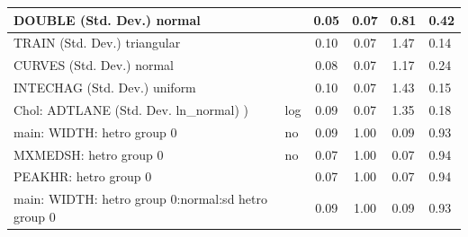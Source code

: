 \begin{table}
\begin{center}
\begin{tabular}{|l|l|c|c|c|l|}
			\hline
			DOUBLE (Std. Dev.) normal &  & 0.05 & 0.07 & 0.81 & 0.42 \\
			\hline
			TRAIN (Std. Dev.) triangular &  & 0.10 & 0.07 & 1.47 & 0.14 \\
			\hline
			CURVES (Std. Dev.) normal &  & 0.08 & 0.07 & 1.17 & 0.24 \\
			\hline
			INTECHAG (Std. Dev.) uniform &  & 0.10 & 0.07 & 1.43 & 0.15 \\
			\hline
			 Chol: ADTLANE (Std. Dev. ln_normal) ) & log & 0.09 & 0.07 & 1.35 & 0.18 \\
			\hline
			main: WIDTH: hetro group 0 & no & 0.09 & 1.00 & 0.09 & 0.93 \\
			\hline
			MXMEDSH: hetro group 0 & no & 0.07 & 1.00 & 0.07 & 0.94 \\
			\hline
			PEAKHR: hetro group 0 &  & 0.07 & 1.00 & 0.07 & 0.94 \\
			\hline
			main: WIDTH: hetro group 0:normal:sd  hetro group 0 &  & 0.09 & 1.00 & 0.09 & 0.93 \\
			\hline
		\end{tabular}
	\end{center}
\end{table}